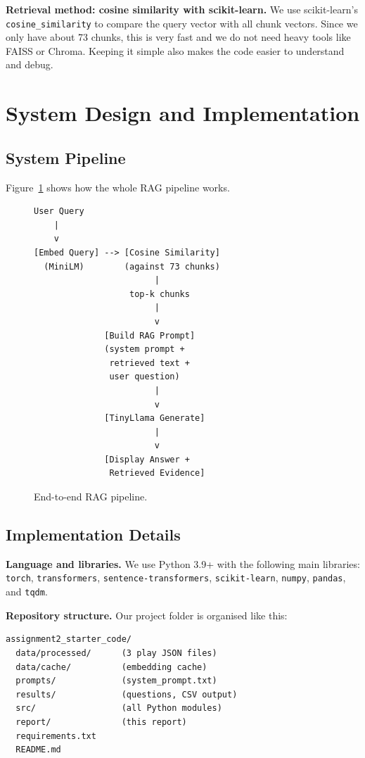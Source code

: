 \documentclass[10pt,conference]{IEEEtran}
\begin{document}
\textbf{Retrieval method: cosine similarity with scikit-learn.} We use scikit-learn's \texttt{cosine\_similarity} to compare the query vector with all chunk vectors. Since we only have about 73 chunks, this is very fast and we do not need heavy tools like FAISS or Chroma. Keeping it simple also makes the code easier to understand and debug.

\section{System Design and Implementation}
\label{sec:system}

\subsection{System Pipeline}

Figure~\ref{fig:pipeline} shows how the whole RAG pipeline works.

\begin{figure}[h]
\centering
\begin{lstlisting}[language={},frame=none]
User Query
    |
    v
[Embed Query] --> [Cosine Similarity]
  (MiniLM)        (against 73 chunks)
                        |
                   top-k chunks
                        |
                        v
              [Build RAG Prompt]
              (system prompt +
               retrieved text +
               user question)
                        |
                        v
              [TinyLlama Generate]
                        |
                        v
              [Display Answer +
               Retrieved Evidence]
\end{lstlisting}
\caption{End-to-end RAG pipeline.}
\label{fig:pipeline}
\end{figure}

\subsection{Implementation Details}

\textbf{Language and libraries.} We use Python 3.9+ with the following main libraries: \texttt{torch}, \texttt{transformers}, \texttt{sentence-transformers}, \texttt{scikit-learn}, \texttt{numpy}, \texttt{pandas}, and \texttt{tqdm}.

\textbf{Repository structure.} Our project folder is organised like this:

\begin{lstlisting}[language={},frame=none]
assignment2_starter_code/
  data/processed/      (3 play JSON files)
  data/cache/          (embedding cache)
  prompts/             (system_prompt.txt)
  results/             (questions, CSV output)
  src/                 (all Python modules)
  report/              (this report)
  requirements.txt
  README.md
\end{lstlisting}
\end{document}
